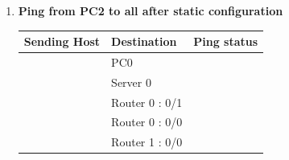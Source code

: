 \documentclass[a4paper,11pt]{article}
\begin{document}
\begin{enumerate}
\begin{enumerate}
              \item \textbf{Ping from PC2 to all after static configuration}
                    \begin{table}[H]
                        \centering
                        \begin{tabular}{| m{9em}| m{12em}| m{9em} |}
                            \hline
                            \textbf{Sending Host}                                           & \textbf{Destination} & \textbf{Ping status}                                                     \\
                            \hline
                            {\cellcolor[rgb]{0.333,0.686,1}}                                & PC0                  & {\cellcolor[rgb]{0.365,1,0.741}}                                         \\
                            \hhline{|>{\arrayrulecolor[rgb]{0.333,0.686,1}}->{\arrayrulecolor{black}}->{\arrayrulecolor[rgb]{0.365,1,0.741}}->{\arrayrulecolor{black}}|}
                            {\cellcolor[rgb]{0.333,0.686,1}}                                & Server 0             & {\cellcolor[rgb]{0.365,1,0.741}}                                         \\
                            \hhline{|>{\arrayrulecolor[rgb]{0.333,0.686,1}}->{\arrayrulecolor{black}}->{\arrayrulecolor[rgb]{0.365,1,0.741}}->{\arrayrulecolor{black}}|}
                            {\cellcolor[rgb]{0.333,0.686,1}}                                & Router 0 : 0/1       & {\cellcolor[rgb]{0.365,1,0.741}}                                         \\
                            \hhline{|>{\arrayrulecolor[rgb]{0.333,0.686,1}}->{\arrayrulecolor{black}}->{\arrayrulecolor[rgb]{0.365,1,0.741}}->{\arrayrulecolor{black}}|}
                            {\cellcolor[rgb]{0.333,0.686,1}}                                & Router 0 : 0/0       & {\cellcolor[rgb]{0.365,1,0.741}}                                         \\
                            \hhline{|>{\arrayrulecolor[rgb]{0.333,0.686,1}}->{\arrayrulecolor{black}}->{\arrayrulecolor[rgb]{0.365,1,0.741}}->{\arrayrulecolor{black}}|}
                            {\cellcolor[rgb]{0.333,0.686,1}}                                & Router 1 : 0/0       & {\cellcolor[rgb]{0.365,1,0.741}}                                         \\

\end{tabular}
\end{table}
\end{enumerate}
\end{enumerate}
\end{document}
